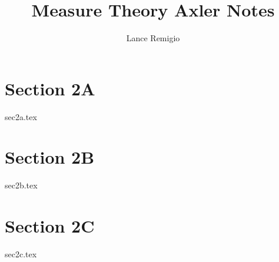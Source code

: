 \documentclass[a4paper]{article}
\title{Measure Theory Axler Notes}
\author{Lance Remigio}
\begin{document}
\maketitle
\tableofcontents

\section{Section 2A}

{sec2a.tex}

\section{Section 2B}

{sec2b.tex}

\section{Section 2C}

{sec2c.tex}
\end{document}
